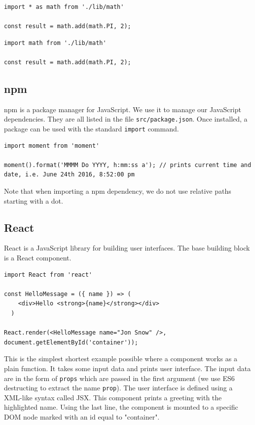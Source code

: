 \begin{verbatim}
import * as math from './lib/math'

const result = math.add(math.PI, 2);
\end{verbatim}

\begin{verbatim}
import math from './lib/math'

const result = math.add(math.PI, 2);
\end{verbatim}

\subsection{npm}
npm is a package manager for JavaScript. We use it to manage our JavaScript dependencies. They are all listed in the file \texttt{src/package.json}. Once installed, a package can be used with the standard \texttt{import} command.

\begin{verbatim}
import moment from 'moment'

moment().format('MMMM Do YYYY, h:mm:ss a'); // prints current time and date, i.e. June 24th 2016, 8:52:00 pm
\end{verbatim}

Note that when importing a npm dependency, we do not use relative paths starting with a dot.

\subsection{React}
React is a JavaScript library for building user interfaces. The base building block is a React component.

\begin{verbatim}
import React from 'react'

const HelloMessage = ({ name }) => (
    <div>Hello <strong>{name}</strong></div>
  )

React.render(<HelloMessage name="Jon Snow" />, document.getElementById('container'));
\end{verbatim}


This is the simplest shortest example possible where a component works as a plain function. It takes some input data and prints user interface. The input data are in the form of \texttt{props} which are passed in the first argument (we use ES6 destructing to extract the name \texttt{prop}). The user interface is defined using a XML-like syntax called JSX. This component prints a greeting with the highlighted name. Using the last line, the component is mounted to a specific DOM node marked with an id equal to "container".

